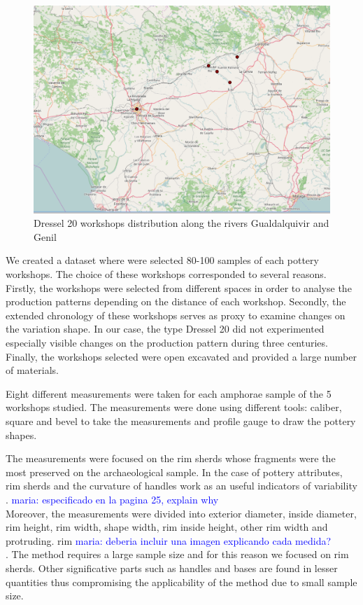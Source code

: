 \documentclass[review]{elsarticle}
\newcommand{\memo}[2]{\textcolor{#1}{#2}}
\newcommand{\maria}[1]{\memo{blue}{maria: #1\\}}
\begin{document}
\begin{figure}[htp]
	\centering
\includegraphics[scale=0.30]{romanworkshop.png}
\caption{Dressel 20 workshops distribution along the rivers Gualdalquivir and Genil}
\label{romanworkshop}
\end{figure} 


We created a dataset where were selected 80-100 samples of each pottery workshops. The choice of these workshops corresponded to several reasons. Firstly, the workshops were selected from different spaces in order to analyse the production patterns depending on the distance of each workshop. Secondly, the extended chronology of these workshops serves as proxy to examine changes on the variation shape. In our case, the type Dressel 20 did not experimented especially visible changes on the production pattern during three centuries.%
Finally, the workshops selected were open excavated and provided a large number of materials.   

Eight different measurements were taken for each amphorae sample of the 5 workshops studied. The measurements were done using different tools: caliber, square and bevel to take the measurements and profile gauge to draw the pottery shapes. 

The measurements were focused on the rim sherds whose fragments were the most preserved on the archaeological sample. In the case of pottery attributes, rim sherds and the curvature of handles work as an useful indicators of variability \citep{berni_millet_epigrafianforica_2008}. \maria{especificado en la pagina 25, explain why}
Moreover, the measurements were divided into exterior diameter, inside diameter, rim height, rim width, shape width, rim inside height, other rim width and protruding. rim \maria{deberia incluir una imagen explicando cada medida?}. The method requires a large sample size and for this reason we focused on rim sherds. Other significative parts such as handles and bases are found in lesser quantities thus compromising the applicability of the method due to small sample size.
\end{document}
